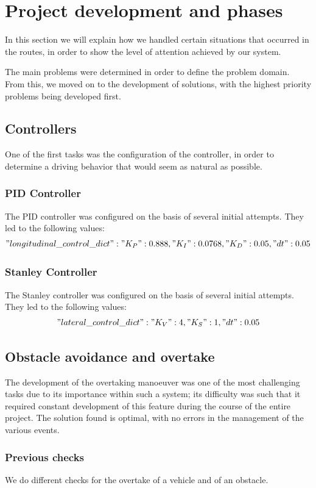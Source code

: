 \documentclass{article}
\begin{document}
\section{Project development and phases }
In this section we will explain how we handled certain situations that occurred in the routes, 
in order to show the level of attention achieved by our system.

The main problems were determined in order to define the problem domain. 
From this, we moved on to the development of solutions, with the highest priority problems being developed first.
\subsection{Controllers}
One of the first tasks was the configuration of the controller, in order to determine a driving behavior that 
would seem as natural as possible. 
\subsubsection{PID Controller}
The PID controller was configured on the basis of several initial attempts. They led to the following values:
$$"longitudinal\_control\_dict" : {"K_P": 0.888 , "K_I": 0.0768, "K_D": 0.05, "dt": 0.05}$$

\subsubsection{Stanley Controller}
The Stanley controller was configured on the basis of several initial attempts. They led to the following values:
$$"lateral\_control\_dict" : {"K_V": 4, "K_S": 1, "dt": 0.05}$$

\subsection{Obstacle avoidance and overtake}
The development of the overtaking manoeuver was one of the most challenging tasks due to its importance 
within such a system; its difficulty was such that it required constant development of this feature during 
the course of the entire project. The solution found is optimal, with no errors in the management of the 
various events.

\subsubsection*{Previous checks}
We do different checks for the overtake of a vehicle and of an obstacle.
\end{document}
